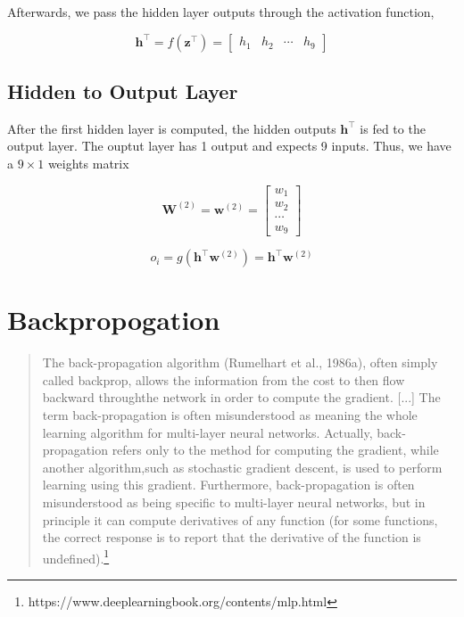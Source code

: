 \documentclass[12pt]{article}%
\begin{document}
	Afterwards, we pass the hidden layer outputs through the activation function,
	
	$$
	\mathbf{h}^\intercal = f(\mathbf{z}^\intercal)
	= \begin{bmatrix}
	h_1 & h_2 & \cdots & h_9
	\end{bmatrix}
	$$
	
	
\subsection{Hidden to Output Layer}

	After the first hidden layer is computed, the hidden outputs $\mathbf{h}^\intercal$ is fed to the output layer. The ouptut layer has 1 output and expects 9 inputs. Thus, we have a $9 \times 1$ weights matrix

	$$
	\mathbf{W}^{(2)} = \mathbf{w}^{(2)}
	= \begin{bmatrix}
	w_1 \\ 
	w_2 \\ 
	\cdots \\ 
	w_9
	\end{bmatrix}
	$$


	$$
	o_i = g(\mathbf{h^\intercal} \mathbf{w}^{(2)}) = \mathbf{h^\intercal} \mathbf{w}^{(2)}
	$$



\section{Backpropogation}


\begin{quote}
The back-propagation algorithm (Rumelhart et al., 1986a), often simply called backprop, allows the information from the cost to then ﬂow backward throughthe network in order to compute the gradient.
[...]
The term back-propagation is often misunderstood as meaning the whole learning algorithm for multi-layer neural networks. Actually, back-propagation refers only to the method for computing the gradient, while another algorithm,such as stochastic gradient descent, is used to perform learning using this gradient. Furthermore, back-propagation is often misunderstood as being speciﬁc to multi-layer neural networks, but in principle it can compute derivatives of any function (for some functions, the correct response is to report that the derivative of the function is undeﬁned).\footnote{https://www.deeplearningbook.org/contents/mlp.html}
\end{quote} 
\end{document}

